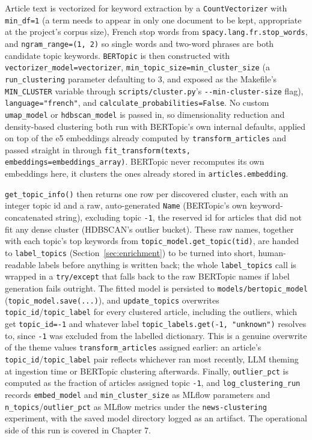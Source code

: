 \begin{sloppypar}
Article text is vectorized for keyword extraction by a \texttt{CountVectorizer} with \texttt{min\_df=1} (a term needs to appear in only one document to be kept, appropriate at the project's corpus size), French stop words from \texttt{spacy.lang.fr.stop\_words}, and \texttt{ngram\_range=(1, 2)} so single words and two-word phrases are both candidate topic keywords. \texttt{BERTopic} is then constructed with \texttt{vectorizer\_model=vectorizer}, \texttt{min\_topic\_size=\allowbreak min\_cluster\_size} (a \texttt{run\_clustering} parameter defaulting to 3, and exposed as the Makefile's \texttt{MIN\_CLUSTER} variable through \texttt{scripts/\allowbreak cluster.py}'s \texttt{-{}-min-cluster-size} flag), \texttt{language="french"}, and \texttt{calculate\_probabilities=False}. No custom \texttt{umap\_model} or \texttt{hdbscan\_model} is passed in, so dimensionality reduction and density-based clustering both run with BERTopic's own internal defaults, applied on top of the e5 embeddings already computed by \texttt{transform\_articles} and passed straight in through \texttt{fit\_transform(texts, embeddings=\allowbreak embeddings\_array)}. BERTopic never recomputes its own embeddings here, it clusters the ones already stored in \texttt{articles.embedding}.
\end{sloppypar}

\texttt{get\_topic\_info()} then returns one row per discovered cluster, each with an integer topic id and a raw, auto-generated \texttt{Name} (BERTopic's own keyword-concatenated string), excluding topic \texttt{-1}, the reserved id for articles that did not fit any dense cluster (HDBSCAN's outlier bucket). These raw names, together with each topic's top keywords from \texttt{topic\_model.get\_topic(tid)}, are handed to \texttt{label\_topics} (Section~\ref{sec:enrichment}) to be turned into short, human-readable labels before anything is written back; the whole \texttt{label\_topics} call is wrapped in a \texttt{try/except} that falls back to the raw BERTopic names if label generation fails outright. The fitted model is persisted to \texttt{models/bertopic\_model} (\texttt{topic\_model.save(...)}), and \texttt{update\_topics} overwrites \texttt{topic\_id}/\texttt{topic\_label} for every clustered article, including the outliers, which get \texttt{topic\_id=-1} and whatever label \texttt{topic\_labels.get(-1, "unknown")} resolves to, since \texttt{-1} was excluded from the labelled dictionary. This is a genuine overwrite of the theme values \texttt{transform\_articles} assigned earlier: an article's \texttt{topic\_id}/\texttt{topic\_label} pair reflects whichever ran most recently, LLM theming at ingestion time or BERTopic clustering afterwards. Finally, \texttt{outlier\_pct} is computed as the fraction of articles assigned topic \texttt{-1}, and \texttt{log\_clustering\_run} records \texttt{embed\_model} and \texttt{min\_cluster\_size} as MLflow parameters and \texttt{n\_topics}/\texttt{outlier\_pct} as MLflow metrics under the \texttt{news-clustering} experiment, with the saved model directory logged as an artifact. The operational side of this run is covered in Chapter 7.

